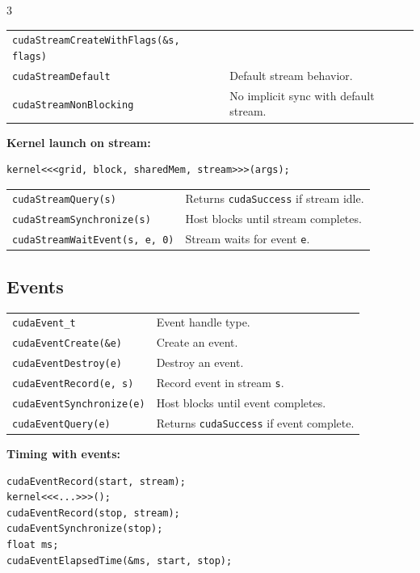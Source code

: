 \begin{multicols*}{3}
\begin{tabularx}{\linewidth}{lX}
\texttt{cudaStreamCreateWithFlags(\&s, flags)} & \\
\quad \texttt{cudaStreamDefault}      & Default stream behavior. \\
\quad \texttt{cudaStreamNonBlocking}  & No implicit sync with default stream. \\
\hline
\end{tabularx}

\textbf{Kernel launch on stream:}
\begin{mdframed}[nobreak=true,backgroundcolor=gray!10,linecolor=Firebrick4]
\begin{verbatim}
kernel<<<grid, block, sharedMem, stream>>>(args);
\end{verbatim}
\end{mdframed}

\begin{tabularx}{\linewidth}{lX}
\texttt{cudaStreamQuery(s)}       & Returns \texttt{cudaSuccess} if stream idle. \\
\texttt{cudaStreamSynchronize(s)} & Host blocks until stream completes. \\
\texttt{cudaStreamWaitEvent(s, e, 0)} & Stream waits for event \texttt{e}. \\
\end{tabularx}

\subsection*{Events}

\begin{tabularx}{\linewidth}{lX}
\hline
\texttt{cudaEvent\_t}            & Event handle type. \\
\texttt{cudaEventCreate(\&e)}    & Create an event. \\
\texttt{cudaEventDestroy(e)}     & Destroy an event. \\
\texttt{cudaEventRecord(e, s)}   & Record event in stream \texttt{s}. \\
\texttt{cudaEventSynchronize(e)} & Host blocks until event completes. \\
\texttt{cudaEventQuery(e)}       & Returns \texttt{cudaSuccess} if event complete. \\
\hline
\end{tabularx}

\textbf{Timing with events:}
\begin{mdframed}[nobreak=true,backgroundcolor=gray!10,linecolor=Firebrick4]
\begin{verbatim}
cudaEventRecord(start, stream);
kernel<<<...>>>();
cudaEventRecord(stop, stream);
cudaEventSynchronize(stop);
float ms;
cudaEventElapsedTime(&ms, start, stop);
\end{verbatim}
\end{mdframed}


\end{multicols*}
